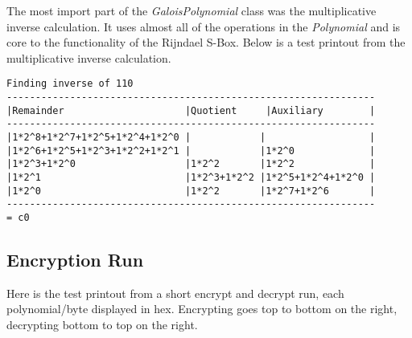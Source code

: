 \documentclass{article}
\begin{document}

The most import part of the {\it GaloisPolynomial} class was the multiplicative inverse calculation.  It uses almost all of the operations in the {\it Polynomial} and is core to the functionality of the Rijndael S-Box.  Below is a test printout from the multiplicative inverse calculation.\\
\begin{lstlisting}
Finding inverse of 110
----------------------------------------------------------------
|Remainder                     |Quotient     |Auxiliary        |
----------------------------------------------------------------
|1*2^8+1*2^7+1*2^5+1*2^4+1*2^0 |            |                  |
|1*2^6+1*2^5+1*2^3+1*2^2+1*2^1 |            |1*2^0             |
|1*2^3+1*2^0                   |1*2^2       |1*2^2             |
|1*2^1                         |1*2^3+1*2^2 |1*2^5+1*2^4+1*2^0 |
|1*2^0                         |1*2^2       |1*2^7+1*2^6       |
----------------------------------------------------------------
= c0
\end{lstlisting}

\subsection{Encryption Run}

Here is the test printout from a short encrypt and decrypt run, each polynomial/byte displayed in hex. Encrypting goes top to bottom on the right, decrypting bottom to top on the right.\\
\end{document}
